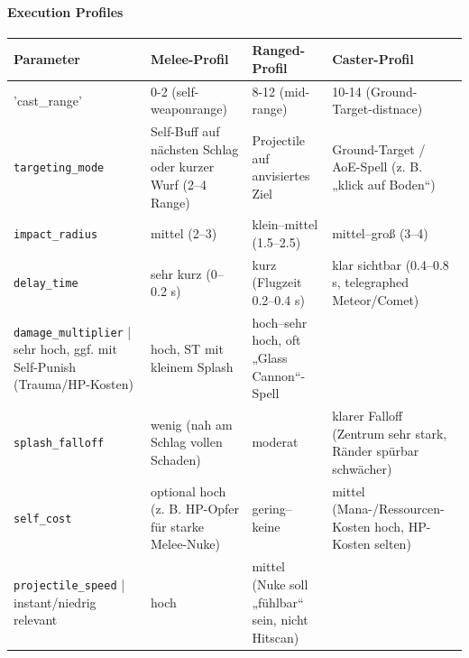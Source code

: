 \paragraph{Execution Profiles}{}
\scriptsize %
\begin{tabular}{p{3cm} | p{4cm} | p{4cm} | p{4cm}}
	Parameter          & Melee-Profil                                               & Ranged-Profil                                             & Caster-Profil                                                       \\
	\hline
	'cast\_range'        & 0-2 (self-weaponrange)                                   & 8-12 (mid-range)                                 & 10-14 (Ground-Target-distnace)  \\
	\texttt{targeting\_mode}   & Self-Buff auf nächsten Schlag oder kurzer Wurf (2–4 Range) & Projectile auf anvisiertes Ziel                           & Ground-Target / AoE-Spell (z. B. „klick auf Boden“)                 \\
	\texttt{impact\_radius}    & mittel (2–3)                                              & klein–mittel (1.5–2.5)                                    & mittel–groß (3–4)                                                   \\
	\texttt{delay\_time}       & sehr kurz (0–0.2 s)                                       & kurz (Flugzeit 0.2–0.4 s)                                 & klar sichtbar (0.4–0.8 s, telegraphed Meteor/Comet)                 \\
	\texttt{damage\_multiplier} | sehr hoch, ggf. mit Self-Punish (Trauma/HP-Kosten)        & hoch, ST mit kleinem Splash                               & hoch–sehr hoch, oft „Glass Cannon“-Spell                           \\
	\texttt{splash\_falloff}   & wenig (nah am Schlag vollen Schaden)                      & moderat                                                   & klarer Falloff (Zentrum sehr stark, Ränder spürbar schwächer)      \\
	\texttt{self\_cost}        & optional hoch (z. B. HP-Opfer für starke Melee-Nuke)      & gering–keine                                              & mittel (Mana-/Ressourcen-Kosten hoch, HP-Kosten selten)            \\
	\texttt{projectile\_speed} | instant/niedrig relevant                                  & hoch                                                      & mittel (Nuke soll „fühlbar“ sein, nicht Hitscan)                    \\
	\hline
\end{tabular}
\normalsize

